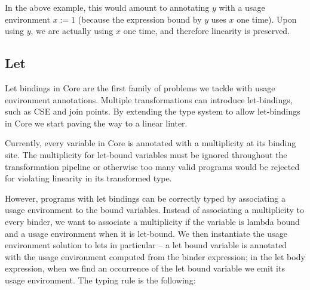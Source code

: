 \documentclass[]{lwnovathesis}
\begin{document}
In the above example, this would amount to annotating $y$ with a usage
environment $x := 1$ (because the expression bound by $y$ uses $x$ one time).
Upon using $y$, we are actually using $x$ one time, and therefore linearity is
preserved.







\subsection{Let}

Let bindings in Core are the first family of problems we tackle with usage
environment annotations. Multiple transformations can introduce let-bindings,
such as CSE and join points. By extending the type system to allow let-bindings in Core
we start paving the way to a linear linter.

Currently, every variable in Core is annotated with a multiplicity at its binding
site. The multiplicity for let-bound variables must be ignored throughout the
transformation pipeline or otherwise too many valid programs would be
rejected for violating linearity in its transformed type.

However, programs with let bindings can be correctly typed by associating a
usage environment to the bound variables. Instead of associating a multiplicity
to every binder, we want to associate a multiplicity if the variable is lambda
bound and a usage environment when it is let-bound. We then instantiate the usage
environment solution to lets in particular -- a let bound variable is annotated
with the usage environment computed from the binder expression; in the let body
expression, when we find an occurrence of the let bound variable we emit its
usage environment. The typing rule is the following:
\end{document}
